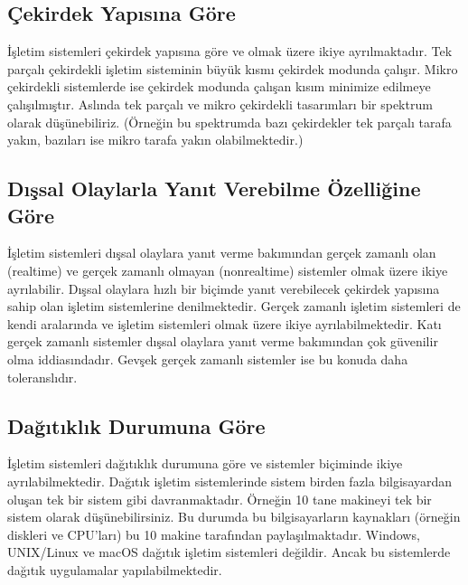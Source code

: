 \documentclass[a4paper,10pt,turkish]{sphinxmanual}
\begin{document}
\subsection{Çekirdek Yapısına Göre}
\label{\detokenize{introduction:cekirdek-yapisina-gore}}
\sphinxAtStartPar
İşletim sistemleri çekirdek yapısına göre  ve
 olmak üzere ikiye ayrılmaktadır. Tek parçalı çekirdekli
işletim sisteminin büyük kısmı çekirdek modunda çalışır. Mikro çekirdekli sistemlerde ise
çekirdek modunda çalışan kısım minimize edilmeye çalışılmıştır. Aslında tek parçalı ve
mikro çekirdekli tasarımları bir spektrum olarak düşünebiliriz. (Örneğin bu spektrumda
bazı çekirdekler tek parçalı tarafa yakın, bazıları ise mikro tarafa yakın olabilmektedir.)


\subsection{Dışsal Olaylarla Yanıt Verebilme Özelliğine Göre}
\label{\detokenize{introduction:dissal-olaylarla-yanit-verebilme-ozelligine-gore}}
\sphinxAtStartPar
İşletim sistemleri dışsal olaylara yanıt verme bakımından gerçek zamanlı olan (real\sphinxhyphen{}time)
ve gerçek zamanlı olmayan (non\sphinxhyphen{}real\sphinxhyphen{}time) sistemler olmak üzere ikiye ayrılabilir. Dışsal
olaylara hızlı bir biçimde yanıt verebilecek çekirdek yapısına sahip olan işletim
sistemlerine  denilmektedir. Gerçek zamanlı
işletim sistemleri de kendi aralarında  ve 
işletim sistemleri olmak üzere ikiye ayrılabilmektedir. Katı gerçek zamanlı sistemler
dışsal olaylara yanıt verme bakımından çok güvenilir olma iddiasındadır. Gevşek gerçek
zamanlı sistemler ise bu konuda daha toleranslıdır.


\subsection{Dağıtıklık Durumuna Göre}
\label{\detokenize{introduction:dagitiklik-durumuna-gore}}
\sphinxAtStartPar
İşletim sistemleri dağıtıklık durumuna göre  ve  sistemler biçiminde ikiye ayrılabilmektedir. Dağıtık işletim
sistemlerinde sistem birden fazla bilgisayardan oluşan tek bir sistem gibi davranmaktadır.
Örneğin 10 tane makineyi tek bir sistem olarak düşünebilirsiniz. Bu durumda bu
bilgisayarların kaynakları (örneğin diskleri ve CPU’ları) bu 10 makine tarafından
paylaşılmaktadır. Windows, UNIX/Linux ve macOS dağıtık işletim sistemleri değildir. Ancak
bu sistemlerde dağıtık uygulamalar yapılabilmektedir.
\end{document}
